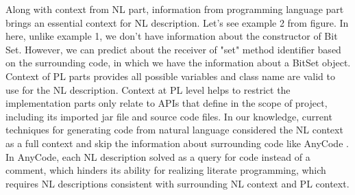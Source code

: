 Along with context from NL part, information from programming language part brings an essential context for NL description. Let's see example 2 from figure. In here, unlike example 1, we don't have information about the constructor of Bit Set. However, we can predict about the receiver of "set" method identifier based on the surrounding code, in which we have the information about a BitSet object. Context of PL parts provides all possible variables and class name are valid to use for the NL description. Context at PL level helps to restrict the implementation parts only relate to APIs that define in the scope of project, including its imported jar file and source code files. In our knowledge, current techniques for generating code from natural language considered the NL context as a full context and skip the information about surrounding code like AnyCode . In AnyCode, each NL description solved as a query for code instead of a comment, which hinders its ability for realizing literate programming, which requires NL descriptions consistent with surrounding NL context and PL context.

